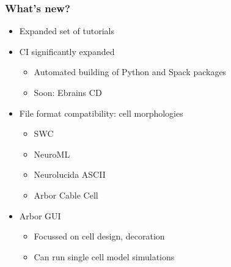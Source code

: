 \documentclass[t]{beamer}
\begin{document}
\begin{frame}
    \frametitle{What's new?}
    \begin{itemize}
    \item Expanded set of tutorials
    \item CI significantly expanded
    \begin{itemize}
    \item Automated building of Python and Spack packages
    \item Soon: Ebrains CD
    \end{itemize}
    \item File format compatibility: cell morphologies
    \begin{itemize}
    \item SWC
    \item NeuroML
    \item Neurolucida ASCII
    \item Arbor Cable Cell
    \end{itemize}
    \item Arbor GUI
    \begin{itemize}
    \item Focussed on cell design, decoration
    \item Can run single cell model simulations
    \end{itemize}
    \end{itemize}
\end{frame}
\end{document}
